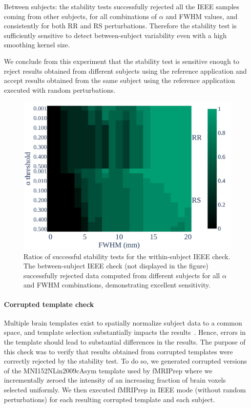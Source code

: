 \documentclass[lettersize,journal]{IEEEtran}
\newcommand{\fmriprep}{fMRIPrep\xspace}
\begin{document}
Between subjects: the stability tests successfully rejected all the IEEE samples coming from other subjects, for all combinations of $\alpha$ and FWHM values, and consistently for both RR and RS perturbations. Therefore the stability test is sufficiently sensitive to detect between-subject variability even with a high smoothing kernel size.

We conclude from this experiment that the stability test is sensitive enough to reject results obtained from different subjects using the reference application and accept results obtained from the same subject using the reference application executed with random perturbations.

\begin{figure}
  \centering
  \includegraphics[width=\linewidth]{figures/inter-subject/inter_mct_fwe_bonferroni.pdf}
  \caption{Ratios of successful stability tests for the within-subject IEEE check. The between-subject IEEE check (not displayed in the figure) successfully rejected data computed from different subjects for all $\alpha$ and FWHM combinations, demonstrating excellent sensitivity.
  }
  \label{fig:ieee-check}
\end{figure}

\paragraph{Corrupted template check}

Multiple brain templates exist to spatially normalize subject data to a common space, and template selection substantially impacts the results~\cite{li2021moving}. Hence, errors in the template should lead to substantial differences in the results. The purpose of this check was to verify that results obtained from corrupted templates were correctly rejected by the stability test.
To do so, we generated corrupted versions of the MNI152NLin2009cAsym template used by \fmriprep where we incrementally zeroed the intensity of an increasing fraction of brain voxels selected uniformly. We then executed \fmriprep in IEEE mode (without random perturbations) for each resulting corrupted template and each subject.
\end{document}
